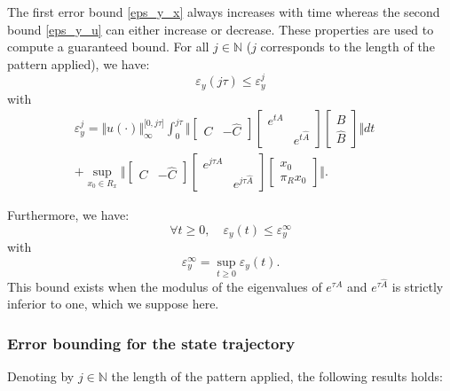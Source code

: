 The first error bound \eqref{eps_y_x} always increases with time whereas the second bound \eqref{eps_y_u} can either increase or decrease. 
These properties are used to compute a guaranteed bound.
For all $j \in \mathbb{N}$ ($j$ corresponds to the length of the pattern applied), we have:
\[ \varepsilon_y(j \tau) \leq \varepsilon_y^j \]
with
{\small
\begin{multline}
 \varepsilon_y^j = \Vert u( \cdot ) \Vert_\infty^{\lbrack 0 , j \tau \rbrack } \int_0^{j \tau}  \Vert 
\left\lbrack
\begin{array}{cc}
C & -\hat C
\end{array}
\right\rbrack
\left\lbrack \begin{array}{cc}
e^{tA} & \\ & e^{t \hat A}
\end{array}
\right\rbrack
\left\lbrack \begin{array}{c}
B \\ \hat B
\end{array}
\right\rbrack \Vert dt \quad
\\ +   
\sup_{x_0 \in R_x}  \Vert 
\left\lbrack
\begin{array}{cc}
C & -\hat C
\end{array}
\right\rbrack
\left\lbrack \begin{array}{cc}
e^{j \tau A} & \\ & e^{j \tau \hat A}
\end{array}
\right\rbrack
\left\lbrack \begin{array}{c}
x_0 \\ \pi_R x_0
\end{array}
\right\rbrack \Vert .
\label{eq:boundy}
\end{multline}
}

Furthermore, we have:
\[ \forall t \geq 0, \quad \varepsilon_y(t) \leq \varepsilon_y^\infty \]
with
\begin{equation}
 \varepsilon_y^\infty = \sup_{t\geq0} \varepsilon_y(t).
 \label{eq:boundyinf}
\end{equation}
This bound exists when the modulus of the eigenvalues of $e^{\tau A}$ and $e^{\tau \hat A}$ is strictly
 inferior to one, which we suppose here.
 
 \subsubsection{Error bounding for the state trajectory}
Denoting by $j \in \mathbb{N}$ the length of
the pattern applied, the following results holds:

